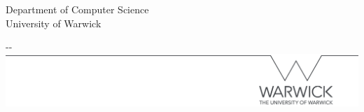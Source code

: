 \makeatletter
\begin{titlepage}

\textbf{\Huge \@title} \\[1.5cm] 
\Large \textbf{\@author} \\
Department of Computer Science \\
University of Warwick \\

\vfill 

\begin{adjustwidth}{-\oddsidemargin-1in}{-\rightmargin}
    \centering
    \includegraphics[width=\paperwidth]{line.png}
\end{adjustwidth}

\vspace*{-3.5cm}

\end{titlepage}
\makeatother